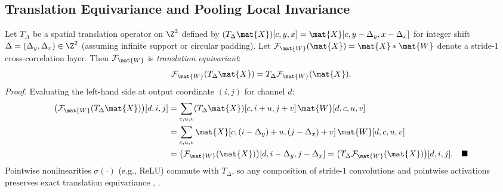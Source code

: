\documentclass[../../../../master.tex]{subfiles}
\begin{document}

\subsection{Translation Equivariance and Pooling Local Invariance}

\begin{coremath}
\label{box:cnn:equivariance}
Let $T_{\Delta}$ be a spatial translation operator on $\Z^2$ defined by $(T_{\Delta} \mat{X})[c, y, x] = \mat{X}[c, y - \Delta_y, x - \Delta_x]$ for integer shift $\Delta = (\Delta_y, \Delta_x) \in \Z^2$ (assuming infinite support or circular padding). Let $\mathcal{F}_{\mat{W}}(\mat{X}) = \mat{X} * \mat{W}$ denote a stride-$1$ cross-correlation layer. Then $\mathcal{F}_{\mat{W}}$ is \emph{translation equivariant}:
\begin{equation}
\label{eq:cnn:equivariance}
\mathcal{F}_{\mat{W}}(T_{\Delta} \mat{X}) = T_{\Delta} \mathcal{F}_{\mat{W}}(\mat{X}).
\end{equation}
\emph{Proof.} Evaluating the left-hand side at output coordinate $(i, j)$ for channel $d$:
\begin{align*}
\big(\mathcal{F}_{\mat{W}}(T_{\Delta}\mat{X})\big)[d, i, j]
&= \sum_{c, u, v} (T_{\Delta}\mat{X})[c, i + u, j + v]\, \mat{W}[d, c, u, v] \\
&= \sum_{c, u, v} \mat{X}[c, (i - \Delta_y) + u, (j - \Delta_x) + v]\, \mat{W}[d, c, u, v] \\
&= \big(\mathcal{F}_{\mat{W}}(\mat{X})\big)[d, i - \Delta_y, j - \Delta_x] = \big(T_{\Delta}\mathcal{F}_{\mat{W}}(\mat{X})\big)[d, i, j]. \quad \blacksquare
\end{align*}
Pointwise nonlinearities $\sigma(\cdot)$ (e.g., ReLU) commute with $T_{\Delta}$, so any composition of stride-$1$ convolutions and pointwise activations preserves exact translation equivariance , .


\end{coremath}
\end{document}
